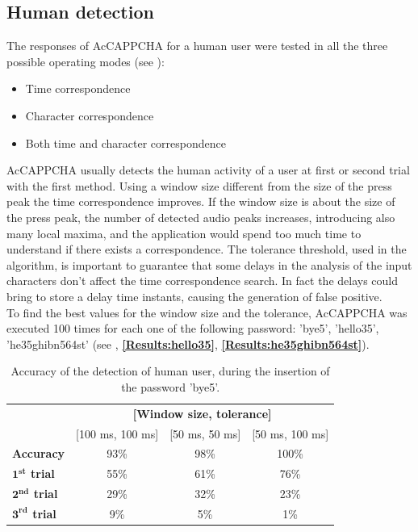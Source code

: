 \subsection{Human detection}\label{Results:human}
The responses of AcCAPPCHA for a human user were tested in all the three possible operating modes (see ): 
\begin{itemize}
\item{Time correspondence}
\item{Character correspondence}
\item{Both time and character correspondence}
\end{itemize}
AcCAPPCHA usually detects the human activity of a user at first or second trial  with the first method. Using a window size different from the size of the press peak the time correspondence improves. If the window size is about the size of the press peak, the number of detected audio peaks increases, introducing also many local maxima, and the application would spend too much time to understand if there exists a correspondence. The tolerance threshold, used in the algorithm, is important to guarantee that some delays in the analysis of the input characters don't affect the time correspondence search. In fact the delays could bring to store a delay time instants, causing the generation of false positive.\\
To find the best values for the window size and the tolerance, AcCAPPCHA was executed 100 times for each one of the following password: 'bye5', 'hello35', 'he35ghibn564st' (see , \textbf{\ref{Results:hello35}}, \textbf{\ref{Results:he35ghibn564st}}).
\begin{table}[H]
\centering\footnotesize
\begin{tabular}{lccc}
\cline{2-4}
&\multicolumn{3}{c}{\textbf{[Window size, tolerance]}}\\
\cline{2-4}
&{[100 ms, 100 ms]}&{[50 ms, 50 ms]}&{[50 ms, 100 ms]}\\
\hline
{\textbf{Accuracy}}&{93\%}&{98\%}&{100\%}\\
\hline
{\textbf{$\mathbf{1^{st}}$ trial}}&{55\%}&{61\%}&{76\%}\\
\hline
{\textbf{$\mathbf{2^{nd}}$ trial}}&{29\%}&{32\%}&{23\%}\\
\hline
{\textbf{$\mathbf{3^{rd}}$ trial}}&{9\%}&{5\%}&{1\%}\\
\hline
\end{tabular}
\caption{\footnotesize{Accuracy of the detection of human user, during the insertion of the password 'bye5'.}}
\label{Results:bye5}
\end{table}
